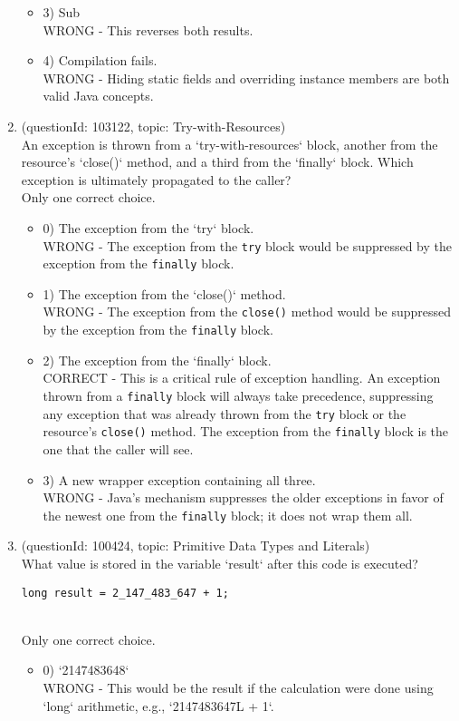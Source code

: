 \documentclass[12pt]{article}
\begin{document}
\begin{enumerate}[label=(\arabic*)]
\begin{itemize}
\item 3) Sub\nSuper
 \\ 
WRONG - This reverses both results.

\item 4) Compilation fails.
 \\ 
WRONG - Hiding static fields and overriding instance members are both valid Java concepts.

\end{itemize}
\item (questionId: 103122, topic: Try-with-Resources) \\ 
An exception is thrown from a `try-with-resources` block, another from the resource's `close()` method, and a third from the `finally` block. Which exception is ultimately propagated to the caller?
\\ \noindent Only one correct choice. 
\begin{itemize}
\item 0) The exception from the `try` block.
 \\ 
WRONG - The exception from the \verb|try| block would be suppressed by the exception from the \verb|finally| block.

\item 1) The exception from the `close()` method.
 \\ 
WRONG - The exception from the \verb|close()| method would be suppressed by the exception from the \verb|finally| block.

\item 2) The exception from the `finally` block.
 \\ 
CORRECT - This is a critical rule of exception handling. An exception thrown from a \verb|finally| block will always take precedence, suppressing any exception that was already thrown from the \verb|try| block or the resource's \verb|close()| method. The exception from the \verb|finally| block is the one that the caller will see.

\item 3) A new wrapper exception containing all three.
 \\ 
WRONG - Java's mechanism suppresses the older exceptions in favor of the newest one from the \verb|finally| block; it does not wrap them all.

\end{itemize}
\item (questionId: 100424, topic: Primitive Data Types and Literals) \\ 
What value is stored in the variable `result` after this code is executed?
\begin{verbatim}
long result = 2_147_483_647 + 1;
\end{verbatim}
\\ \noindent Only one correct choice. 
\begin{itemize}
\item 0) `2147483648`
 \\ 
WRONG - This would be the result if the calculation were done using `long` arithmetic, e.g., `2147483647L + 1`.


\end{itemize}
\end{enumerate}
\end{document}

